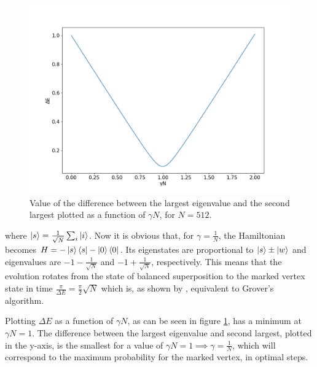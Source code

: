 \documentclass[../../dissertation.tex]{subfiles}
\begin{document}
\begin{figure}[h]
	\centering \includegraphics[scale=0.40]{img/ContQuantumWalk/Search/gamma512.png}
	\caption{Value of the difference between the largest eigenvalue and the second largest plotted as a function of $\gamma N$, for $N=512$. }\label{fig:ContSearch}
	\label{fig:gamma512}
\end{figure}
where $\ket{s} = \frac{1}{\sqrt{N}}\sum_i \ket{i}$. Now it is obvious that, for
$\gamma = \frac{1}{N}$, the Hamiltonian becomes $H = -\ket{s}\bra{s} -
\ket{0}\bra{0}$. Its eigenstates are proportional to $\ket{s}\pm\ket{w}$ and
eigenvalues are $-1 - \frac{1}{\sqrt{N}}$ and $-1 + \frac{1}{\sqrt{N}}$,
respectively. This means that the evolution rotates from the state of balanced
superposition to the marked vertex state in time $\frac{\pi}{\Delta E} =
\frac{\pi}{2}\sqrt{N}$ which is, as shown by \cite{farhi2000}, equivalent to
Grover's algorithm.\par

Plotting $\Delta E$ as a function of $\gamma N$, as can be seen in figure
\ref{fig:gamma512}, has a minimum at $\gamma N =1$. The difference between the
largest eigenvalue and second largest, plotted in the y-axis, is the smallest
for a value of $\gamma N = 1 \implies \gamma =\frac{1}{N}$, which will
correspond to the maximum probability for the marked vertex, in optimal steps.\par
\end{document}
